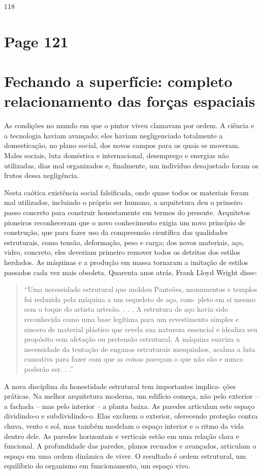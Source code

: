 \documentclass[a4paper]{article}
\begin{document}
118

\newpage
\section*{Page 121}

\section*{Fechando a superfície: completo relacionamento das forças espaciais}

As condições no mundo em que o pintor viveu clamavam por ordem. A ciência
e a tecnologia haviam avançado; eles haviam negligenciado totalmente a domesticação,
no plano social, dos novos campos para os quais se moveram. Males sociais,
luta doméstica e internacional, desemprego e energias não utilizadas,
dias mal organizados e, finalmente, um indivíduo desajustado foram os frutos
dessa negligência.

Nesta caótica existência social falsificada, onde quase todos os materiais
foram mal utilizados, incluindo o próprio ser humano, a arquitetura deu o
primeiro passo concreto para construir honestamente em termos do presente. Arquitetos
pioneiros reconheceram que o novo conhecimento exigia um novo princípio
de construção, que para fazer uso da compreensão científica das qualidades
estruturais, como tensão, deformação, peso e carga; dos novos
materiais, aço, vidro, concreto, eles deveriam primeiro remover todos os detritos dos
estilos herdados. As máquinas e a produção em massa tornaram a
imitação de estilos passados cada vez mais obsoleta. Quarenta anos atrás, Frank
Lloyd Wright disse:

\begin{quote}
``Uma necessidade estrutural que moldou Panteões, monumentos e
templos foi reduzida pela máquina a um esqueleto de aço, com-
pleto em si mesmo sem o toque do artista artesão. . . . A estrutura de aço
havia sido reconhecida como uma base legítima para um revestimento
simples e sincero de material plástico que revela sua natureza essencial
e idealiza seu propósito sem afetação ou pretensão estrutural. A máquina
suaviza a necessidade da tentação de enganos estruturais mesquinhos,
acalma a luta cansativa para fazer com que as coisas pareçam o que não
são e nunca poderão ser. . .''
\end{quote}

A nova disciplina da honestidade estrutural tem importantes implica-
ções práticas. Na melhor arquitetura moderna, um edifício começa, não pelo
exterior -- a fachada -- mas pelo interior -- a planta baixa. As paredes
articulam este espaço dividindo-o e subdividindo-o. Elas excluem o
exterior, oferecendo proteção contra chuva, vento e sol, mas também modelam
o espaço interior e o ritmo da vida dentro dele. As paredes horizontais e verticais
estão em uma relação clara e funcional. A profundidade das paredes, planos
recuados e avançados, articulam o espaço em uma ordem dinâmica de
viver. O resultado é ordem estrutural, um equilíbrio do organismo
em funcionamento, um espaço vivo.
\end{document}
